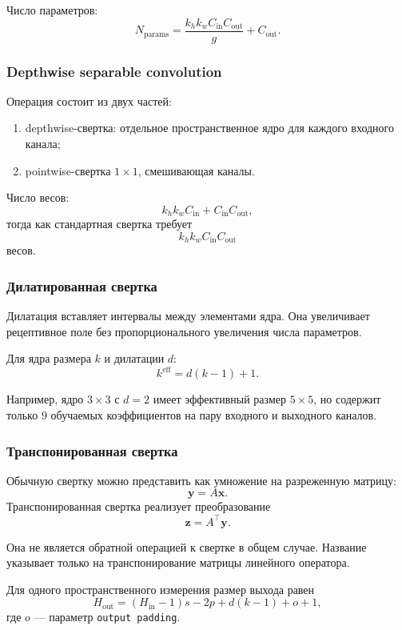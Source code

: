 \documentclass[12pt,a4paper]{article}
\numberwithin{equation}{section}
\theoremstyle{definition}
\theoremstyle{remark}
\begin{document}
Число параметров:
\[
    N_{\mathrm{params}}
    =
    \frac{
        k_hk_wC_{\mathrm{in}}C_{\mathrm{out}}
    }{g}
    +
    C_{\mathrm{out}}.
\]

\subsubsection{Depthwise separable convolution}

Операция состоит из двух частей:

\begin{enumerate}
    \item depthwise-свертка: отдельное пространственное ядро для
    каждого входного канала;
    \item pointwise-свертка \(1\times1\), смешивающая каналы.
\end{enumerate}

Число весов:
\[
    k_hk_wC_{\mathrm{in}}
    +
    C_{\mathrm{in}}C_{\mathrm{out}},
\]
тогда как стандартная свертка требует
\[
    k_hk_wC_{\mathrm{in}}C_{\mathrm{out}}
\]
весов.

\subsubsection{Дилатированная свертка}

Дилатация вставляет интервалы между элементами ядра. Она увеличивает
рецептивное поле без пропорционального увеличения числа параметров.

Для ядра размера \(k\) и дилатации \(d\):
\[
    k^{\mathrm{eff}}=d(k-1)+1.
\]

Например, ядро \(3\times3\) с \(d=2\) имеет эффективный размер
\(5\times5\), но содержит только \(9\) обучаемых коэффициентов на пару
входного и выходного каналов.

\subsubsection{Транспонированная свертка}

Обычную свертку можно представить как умножение на разреженную
матрицу:
\[
    \bm{y}=A\bm{x}.
\]
Транспонированная свертка реализует преобразование
\[
    \bm{z}=A^\top\bm{y}.
\]

Она не является обратной операцией к свертке в общем случае. Название
указывает только на транспонирование матрицы линейного оператора.

Для одного пространственного измерения размер выхода равен
\[
    H_{\mathrm{out}}
    =
    (H_{\mathrm{in}}-1)s
    -2p
    +d(k-1)
    +o
    +1,
\]
где \(o\) --- параметр \texttt{output padding}.
\end{document}
